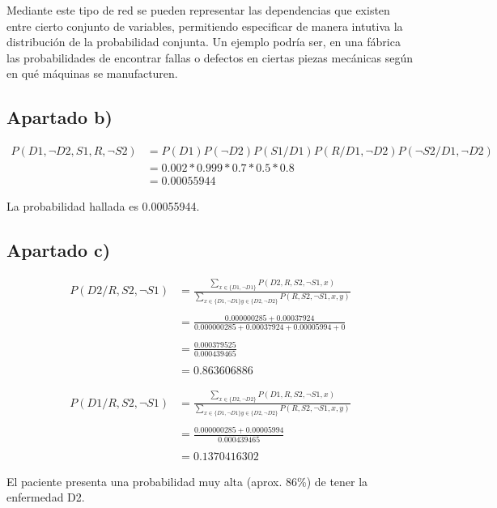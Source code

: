 \documentclass[11pt]{article}
\begin{document}
Mediante este tipo de red se pueden representar las dependencias que existen
entre cierto conjunto de variables, permitiendo especificar de manera intutiva
la distribución de la probabilidad conjunta. Un ejemplo podría ser, en una fábrica
las probabilidades de encontrar fallas o defectos en ciertas piezas mecánicas según
en qué máquinas se manufacturen.


\subsection*{Apartado b)}

\begin{align*}
P(D1, \lnot D2, S1, R, \lnot S2) &= P(D1) P(\lnot D2) P(S1 / D1) P(R / D1, \lnot D2) P (\lnot S2 / D1, \lnot D2) \\
&= 0.002 * 0.999 * 0.7 * 0.5 * 0.8 \\
&= 0.00055944
\end{align*}

La probabilidad hallada es 0.00055944.

\subsection*{Apartado c)}

\begin{align*}
P(D2 / R, S2,\lnot S1) 
&= \frac{\displaystyle\sum_{x \in \{D1, \lnot D1\}} P(D2, R, S2, \lnot S1, x)}{\displaystyle\sum_{x \in \{D1, \lnot D1\} y \in \{D2, \lnot D2\}} P(R, S2, \lnot S1, x, y)} \\ \\
&= \frac{0.000000285 + 0.00037924}{0.000000285 + 0.00037924 + 0.00005994 + 0} \\ \\
&= \frac{0.000379525}{0.000439465} \\ \\
&= 0.863606886
\end{align*}

\begin{align*}
P(D1 / R, S2,\lnot S1) 
&= \frac{\displaystyle\sum_{x \in \{D2, \lnot D2\}} P(D1, R, S2, \lnot S1, x)}{\displaystyle\sum_{x \in \{D1, \lnot D1\} y \in \{D2, \lnot D2\}} P(R, S2, \lnot S1, x, y)} \\ \\
&= \frac{0.000000285 + 0.00005994}{0.000439465} \\ \\
&= 0.1370416302
\end{align*}

El paciente presenta una probabilidad muy alta (aprox. 86\%) de tener la enfermedad D2.
\end{document}
